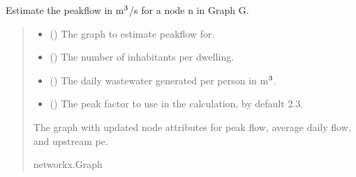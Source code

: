 \documentclass[letterpaper,10pt,english]{sphinxmanual}
\begin{document}
\begin{fulllineitems}
\label{\detokenize{pysewer:pysewer.optimization.estimate_peakflow}}
\pysigstartsignatures
{}
\pysigstopsignatures
\sphinxAtStartPar
Estimate the peakflow in m\(\sp{\text{3}}\)/s for a node n in Graph G.
\begin{quote}\begin{description}
\begin{itemize}
\item {} 
\sphinxAtStartPar
{} () \textendash{} The graph to estimate peakflow for.

\item {} 
\sphinxAtStartPar
{} () \textendash{} The number of inhabitants per dwelling.

\item {} 
\sphinxAtStartPar
{} () \textendash{} The daily wastewater generated per person in m\(\sp{\text{3}}\).

\item {} 
\sphinxAtStartPar
{} (\sphinxstyleliteralemphasis{\sphinxupquote{, }}) \textendash{} The peak factor to use in the calculation, by default 2.3.

\end{itemize}

\sphinxAtStartPar
The graph with updated node attributes for peak flow, average daily flow, and upstream pe.

\sphinxAtStartPar
networkx.Graph

\end{description}\end{quote}

\end{fulllineitems}
\end{document}
